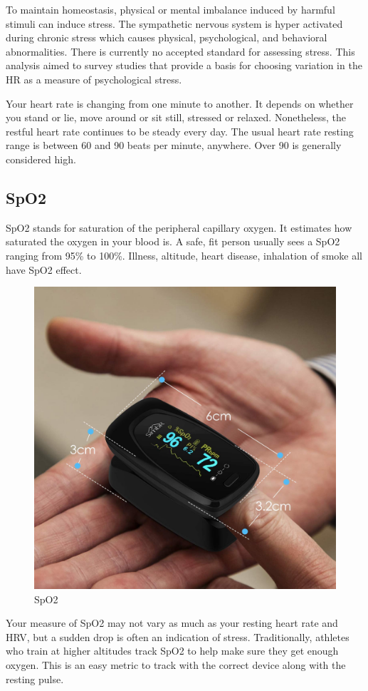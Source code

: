 To maintain homeostasis, physical or mental imbalance induced by harmful stimuli can induce stress. The sympathetic nervous system is hyper activated during chronic stress which causes physical, psychological, and behavioral abnormalities. There is currently no accepted standard for assessing stress. This analysis aimed to survey studies that provide a basis for choosing variation in the \acf{HR} as a measure of psychological stress.\citep{Kim2018StressLiterature}

Your heart rate is changing from one minute to another. It depends on whether you stand or lie, move around or sit still, stressed or relaxed. Nonetheless, the restful heart rate continues to be steady every day. The usual heart rate resting range is between 60 and 90 beats per minute, anywhere. Over 90 is generally considered high.\citep{LeWine2011IncreasePublishing}
\subsection{\acf{SpO2}}
\acs{SpO2} stands for saturation of the peripheral capillary oxygen. It estimates how saturated the oxygen in your blood is. A safe, fit person usually sees a \acs{SpO2} ranging from 95\% to 100\%. Illness, altitude, heart disease, inhalation of smoke all have \acs{SpO2} effect.\citep{Sly2019ManagingBiostrap}
\begin{figure}[hbt!] 
  \centering
  \includegraphics[width=0.6\linewidth]{chap4/image4/spo2.jpg}
  \caption[\acf{SpO2}]{\acf{SpO2}}
  \label{fig:spo2}
\end{figure}
Your measure of \acs{SpO2} may not vary as much as your resting heart rate and HRV, but a sudden drop is often an indication of stress. Traditionally, athletes who train at higher altitudes track \acs{SpO2} to help make sure they get enough oxygen. This is an easy metric to track with the correct device along with the resting pulse.

